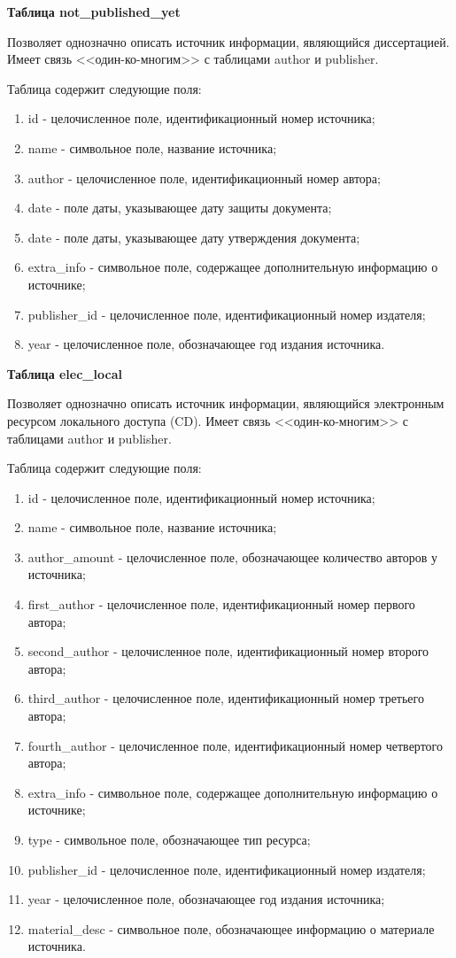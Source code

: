 \hfill \break

{\bf Таблица not\_published\_yet}

Позволяет однозначно описать источник информации, являющийся диссертацией. Имеет связь <<один-ко-многим>> с таблицами author и publisher. 


Таблица содержит следующие поля:
\begin{enumerate}
	\item id - целочисленное поле, идентификационный номер источника;
	\item name - символьное поле, название источника;
	\item author - целочисленное поле, идентификационный номер автора;
	\item date - поле даты, указывающее дату защиты документа;
	\item date - поле даты, указывающее дату утверждения документа;
	\item extra\_info - символьное поле, содержащее дополнительную информацию о источнике;
	\item publisher\_id - целочисленное поле, идентификационный номер издателя;
	\item year - целочисленное поле, обозначающее год издания источника.
\end{enumerate}

\hfill \break

{\bf Таблица elec\_local}

Позволяет однозначно описать источник информации, являющийся электронным ресурсом локального доступа (CD). Имеет связь <<один-ко-многим>> с таблицами author и publisher. 


Таблица содержит следующие поля:
\begin{enumerate}
	\item id - целочисленное поле, идентификационный номер источника;
	\item name - символьное поле, название источника;
	\item author\_amount - целочисленное поле, обозначающее количество авторов у источника;
	\item first\_author - целочисленное поле, идентификационный номер первого автора;
	\item second\_author - целочисленное поле, идентификационный номер второго автора;
	\item third\_author - целочисленное поле, идентификационный номер третьего автора;
	\item fourth\_author - целочисленное поле, идентификационный номер четвертого автора;
	\item extra\_info - символьное поле, содержащее дополнительную информацию о источнике;
	\item type - символьное поле, обозначающее тип ресурса;
	\item publisher\_id - целочисленное поле, идентификационный номер издателя;
	\item year - целочисленное поле, обозначающее год издания источника;
	\item material\_desc - символьное поле, обозначающее информацию о материале источника.
\end{enumerate}

